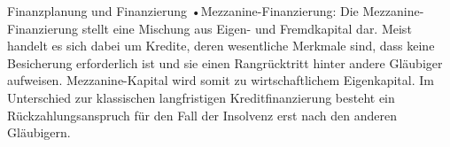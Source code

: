 Finanzplanung und Finanzierung
•Mezzanine-Finanzierung: Die Mezzanine-Finanzierung stellt eine Mischung aus Eigen- und Fremdkapital dar. Meist handelt es sich dabei um Kredite, deren wesentliche Merkmale sind, dass keine Besicherung erforderlich ist und sie einen Rangrücktritt hinter andere Gläubiger aufweisen. Mezzanine-Kapital wird somit zu wirtschaftlichem Eigenkapital. Im Unterschied zur klassischen langfristigen Kreditfinanzierung besteht ein Rückzahlungsanspruch für den Fall der Insolvenz erst nach den anderen Gläubigern.


























